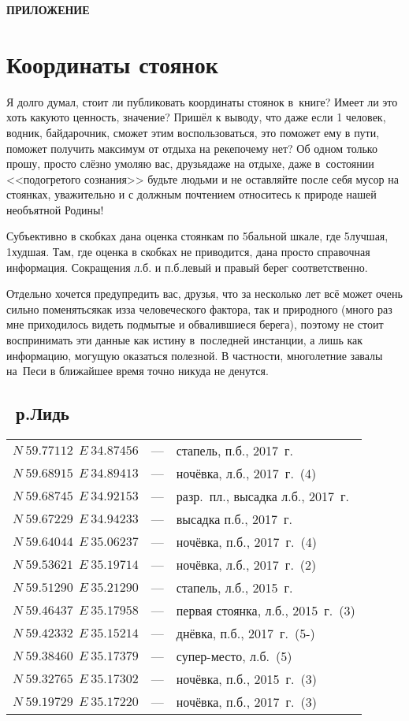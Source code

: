 \afterpage{\blankpage}
\newpage
\appendix
\pagestyle{empty}
{\hfill\large\textbf{ПРИЛОЖЕНИЕ}}
\section*{Координаты стоянок}
Я долго думал, стоит ли публиковать координаты стоянок в~книге? Имеет ли это хоть какую\sdash то ценность, значение? Пришёл к выводу, что даже если 1 человек, водник, байдарочник, сможет этим воспользоваться, это поможет ему в пути, поможет получить максимум от отдыха на реке\mdash почему нет? Об одном только прошу, просто слёзно умоляю вас, друзья\mdash даже на отдыхе, даже в~состоянии <<подогретого сознания>> будьте людьми и не оставляйте после себя мусор на стоянках, уважительно и с должным почтением относитесь к природе нашей необъятной Родины! 

Субъективно в скобках дана оценка стоянкам по 5\sdash бальной шкале, где 5\mdash лучшая, 1\mdash худшая. Там, где оценка в скобках не приводится, дана просто справочная информация. Сокращения л.б. и п.б.\mdash левый и правый берег соответственно.

Отдельно хочется предупредить вас, друзья, что за несколько лет всё может очень сильно поменяться\mdash как из\sdash за человеческого фактора, так и природного (много раз мне приходилось видеть подмытые и обвалившиеся берега), поэтому не стоит воспринимать эти данные как истину в~последней инстанции, а лишь как информацию, могущую оказаться полезной. В частности, многолетние завалы на~Песи в ближайшее время точно никуда не денутся.

\newpage 
\subsection*{~р.Лидь}
\begin{longtable}[c]{>{\raggedright}m{40mm} >{\raggedleft}m{7mm}>{\raggedright}p{65mm} }		
${N~59.77112~~E~34.87456}$ & --- & стапель, п.б., 2017~г.\tabularnewline
${N~59.68915~~E~34.89413}$ & --- & ночёвка, л.б., 2017~г.~(4)\tabularnewline
${N~59.68745~~E~34.92153}$ & --- & разр.~пл., высадка л.б., 2017~г.\tabularnewline
${N~59.67229~~E~34.94233}$ & --- & высадка п.б., 2017~г.\tabularnewline
${N~59.64044~~E~35.06237}$ & --- & ночёвка, п.б., 2017~г.~(4)\tabularnewline
${N~59.53621~~E~35.19714}$ & --- & ночёвка, л.б., 2017~г.~(2)\tabularnewline
${N~59.51290~~E~35.21290}$ & --- & стапель, л.б., 2015~г.\tabularnewline
${N~59.46437~~E~35.17958}$ & --- & первая стоянка, л.б., 2015~г.~(3)\tabularnewline
${N~59.42332~~E~35.15214}$ & --- & днёвка, п.б., 2017~г.~(5-)\tabularnewline
${N~59.38460~~E~35.17379}$ & --- & супер-место, л.б.~(5)\tabularnewline
${N~59.32765~~E~35.17302}$ & --- & ночёвка, п.б., 2015~г.~(3)\tabularnewline 
${N~59.19729~~E~35.17220}$ & --- & ночёвка, п.б., 2017~г.~(3)\tabularnewline
\end{longtable}

